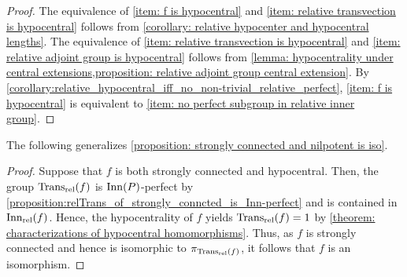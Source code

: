 \begin{proof}
The equivalence of \ref{item: f is hypocentral} and \ref{item: relative transvection is hypocentral} follows from \cref{corollary: relative hypocenter and hypocentral lengths}.
The equivalence of \ref{item: relative transvection is hypocentral} and \ref{item: relative adjoint group is hypocentral} follows from \cref{lemma: hypocentrality under central extensions,proposition: relative adjoint group central extension}.
By \cref{corollary:relative_hypocentral_iff_no_non-trivial_relative_perfect}, \ref{item: f is hypocentral} is equivalent to \ref{item: no perfect subgroup in relative inner group}. 
%
\end{proof}

The following generalizes \cref{proposition: strongly connected and nilpotent is iso}.


\begin{proof}
Suppose that $f$ is both strongly connected and hypocentral. Then, the group $\operatorname{Trans_{rel}}(f)$ is $\operatorname{Inn}(P)$-perfect by \cref{proposition:relTrans_of_strongly_conncted_is_Inn-perfect} and is contained in $\operatorname{Inn_{rel}}(f)$. Hence, the hypocentrality of $f$ yields $\operatorname{Trans_{rel}}(f)=1$ by \cref{theorem: characterizations of hypocentral homomorphisms}. Thus, as $f$ is strongly connected and hence is isomorphic to $\pi_{\operatorname{Trans_{rel}}(f)}$, it follows that $f$ is an isomorphism.
\end{proof}


